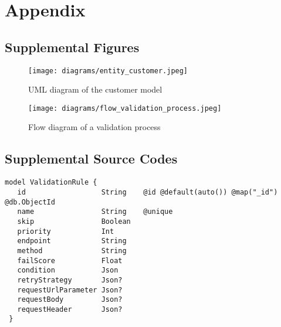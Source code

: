 \appendix
{}

\chapter{Appendix}


 \section{Supplemental Figures}

  \begin{figure}[!ht]
   \texttt{[image: diagrams/entity\_customer.jpeg]}
   \caption{UML diagram of the customer model}
   \label{fig:customer_uml}
  \end{figure}
  
  \begin{figure}[!ht]
    \centering
    \texttt{[image: diagrams/flow\_validation\_process.jpeg]}
    \caption{Flow diagram of a validation process}
    \label{fig:flow_validation}
  \end{figure}

 \section{Supplemental Source Codes}
 
  \begin{lstlisting}[caption={\emph{Prisma} schema of a validation rule (Prisma)}, label={code:prisma}]
 model ValidationRule {
   id                  String    @id @default(auto()) @map("_id") @db.ObjectId
   name                String    @unique
   skip                Boolean
   priority            Int
   endpoint            String
   method              String
   failScore           Float
   condition           Json
   retryStrategy       Json?
   requestUrlParameter Json?
   requestBody         Json?
   requestHeader       Json?
 }
  \end{lstlisting}
  
